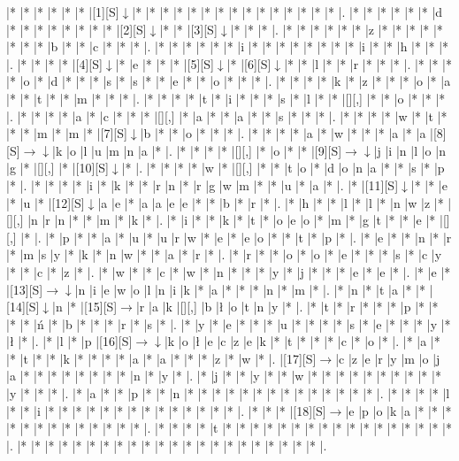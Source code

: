 \documentclass[11pt]{article}
\newcommand\drarr{$\rightarrow \!\!\!\!\! \downarrow$}
\newcommand\rarr{$\rightarrow$}
\newcommand\darr{$\downarrow$}
\begin{document}
\noindent\begin{Puzzle}{21}{33}|*	|*	|*	|*	|*	|*	|[1][S]\darr	|*	|*	|*	|*	|*	|*	|*	|*	|*	|*	|*	|*	|*	|*	|*	|.
|*	|*	|*	|*	|*	|*	|d	|*	|*	|*	|*	|*	|*	|*	|*	|[2][S]\darr	|*	|*	|[3][S]\darr	|*	|*	|*	|.
|*	|*	|*	|*	|*	|*	|z	|*	|*	|*	|*	|*	|*	|*	|*	|b	|*	|*	|c	|*	|*	|*	|.
|*	|*	|*	|*	|*	|*	|i	|*	|*	|*	|*	|*	|*	|*	|*	|i	|*	|*	|h	|*	|*	|*	|.
|*	|*	|*	|*	|[4][S]\darr	|*	|e	|*	|*	|*	|[5][S]\darr	|*	|[6][S]\darr	|*	|*	|l	|*	|*	|r	|*	|*	|*	|.
|*	|*	|*	|*	|o	|*	|d	|*	|*	|*	|s	|*	|s	|*	|*	|e	|*	|*	|o	|*	|*	|*	|.
|*	|*	|*	|*	|k	|*	|z	|*	|*	|*	|o	|*	|a	|*	|*	|t	|*	|*	|m	|*	|*	|*	|.
|*	|*	|*	|*	|t	|*	|i	|*	|*	|*	|s	|*	|l	|*	|*	|[][,]{ }	|*	|*	|o	|*	|*	|*	|.
|*	|*	|*	|*	|a	|*	|c	|*	|*	|*	|[][,]{ }	|*	|a	|*	|*	|a	|*	|*	|s	|*	|*	|*	|.
|*	|*	|*	|*	|w	|*	|t	|*	|*	|*	|m	|*	|m	|*	|[7][S]\darr	|b	|*	|*	|o	|*	|*	|*	|.
|*	|*	|*	|*	|a	|*	|w	|*	|*	|*	|a	|*	|a	|[8][S]\drarr	|k	|o	|l	|u	|m	|n	|a	|*	|.
|*	|*	|*	|*	|[][,]{ }	|*	|o	|*	|*	|[9][S]\drarr	|j	|i	|n	|l	|o	|n	|g	|*	|[][,]{ }	|*	|[10][S]\darr	|*	|.
|*	|*	|*	|*	|w	|*	|[][,]{ }	|*	|*	|t	|o	|*	|d	|o	|n	|a	|*	|*	|s	|*	|p	|*	|.
|*	|*	|*	|*	|i	|*	|k	|*	|*	|r	|n	|*	|r	|g	|w	|m	|*	|*	|u	|*	|a	|*	|.
|*	|[11][S]\darr	|*	|*	|e	|*	|u	|*	|[12][S]\darr	|a	|e	|*	|a	|a	|e	|e	|*	|*	|b	|*	|r	|*	|.
|*	|h	|*	|*	|l	|*	|l	|*	|n	|w	|z	|*	|[][,]{ }	|n	|r	|n	|*	|*	|m	|*	|k	|*	|.
|*	|i	|*	|*	|k	|*	|t	|*	|o	|e	|o	|*	|m	|*	|g	|t	|*	|*	|e	|*	|[][,]{ }	|*	|.
|*	|p	|*	|*	|a	|*	|u	|*	|u	|r	|w	|*	|e	|*	|e	|o	|*	|*	|t	|*	|p	|*	|.
|*	|e	|*	|*	|n	|*	|r	|*	|m	|s	|y	|*	|k	|*	|n	|w	|*	|*	|a	|*	|r	|*	|.
|*	|r	|*	|*	|o	|*	|o	|*	|e	|*	|*	|*	|s	|*	|c	|y	|*	|*	|c	|*	|z	|*	|.
|*	|w	|*	|*	|c	|*	|w	|*	|n	|*	|*	|*	|y	|*	|j	|*	|*	|*	|e	|*	|e	|*	|.
|*	|e	|*	|[13][S]\drarr	|n	|i	|e	|w	|o	|l	|n	|i	|k	|*	|a	|*	|*	|*	|n	|*	|m	|*	|.
|*	|n	|*	|t	|a	|*	|*	|[14][S]\darr	|n	|*	|[15][S]\rarr	|r	|a	|k	|[][,]{ }	|b	|ł	|o	|t	|n	|y	|*	|.
|*	|t	|*	|r	|*	|*	|*	|p	|*	|*	|*	|*	|ń	|*	|b	|*	|*	|*	|r	|*	|s	|*	|.
|*	|y	|*	|e	|*	|*	|*	|u	|*	|*	|*	|*	|s	|*	|e	|*	|*	|*	|y	|*	|ł	|*	|.
|*	|l	|*	|p	|[16][S]\drarr	|k	|o	|ł	|e	|c	|z	|e	|k	|*	|t	|*	|*	|*	|c	|*	|o	|*	|.
|*	|a	|*	|*	|t	|*	|*	|k	|*	|*	|*	|*	|a	|*	|a	|*	|*	|*	|z	|*	|w	|*	|.
|[17][S]\rarr	|c	|z	|e	|r	|y	|m	|o	|j	|a	|*	|*	|*	|*	|*	|*	|*	|*	|n	|*	|y	|*	|.
|*	|j	|*	|*	|y	|*	|*	|w	|*	|*	|*	|*	|*	|*	|*	|*	|*	|*	|y	|*	|*	|*	|.
|*	|a	|*	|*	|p	|*	|*	|n	|*	|*	|*	|*	|*	|*	|*	|*	|*	|*	|*	|*	|*	|*	|.
|*	|*	|*	|*	|l	|*	|*	|i	|*	|*	|*	|*	|*	|*	|*	|*	|*	|*	|*	|*	|*	|*	|.
|*	|*	|*	|[18][S]\rarr	|e	|p	|o	|k	|a	|*	|*	|*	|*	|*	|*	|*	|*	|*	|*	|*	|*	|*	|.
|*	|*	|*	|*	|t	|*	|*	|*	|*	|*	|*	|*	|*	|*	|*	|*	|*	|*	|*	|*	|*	|*	|.
|*	|*	|*	|*	|*	|*	|*	|*	|*	|*	|*	|*	|*	|*	|*	|*	|*	|*	|*	|*	|*	|*	|.\end{Puzzle}
\end{document}
